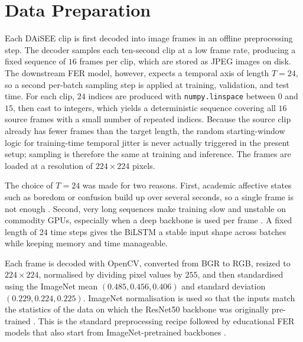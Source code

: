 \section{Data Preparation}\label{sec:method_preparation}

Each DAiSEE clip is first decoded into image frames in an offline preprocessing step. The decoder samples each ten-second clip at a low frame rate, producing a fixed sequence of $16$ frames per clip, which are stored as JPEG images on disk. The downstream FER model, however, expects a temporal axis of length $T = 24$, so a second per-batch sampling step is applied at training, validation, and test time. For each clip, $24$ indices are produced with \texttt{numpy.linspace} between $0$ and $15$, then cast to integers, which yields a deterministic sequence covering all $16$ source frames with a small number of repeated indices. Because the source clip already has fewer frames than the target length, the random starting-window logic for training-time temporal jitter is never actually triggered in the present setup; sampling is therefore the same at training and inference. The frames are loaded at a resolution of $224 \times 224$ pixels.

The choice of $T = 24$ was made for two reasons. First, academic affective states such as boredom or confusion build up over several seconds, so a single frame is not enough \cite{abedi_improving_2021,asaju_adaptive_2022}. Second, very long sequences make training slow and unstable on commodity GPUs, especially when a deep backbone is used per frame \cite{asaju_affects_2021}. A fixed length of $24$ time steps gives the BiLSTM a stable input shape across batches while keeping memory and time manageable.

Each frame is decoded with OpenCV, converted from BGR to RGB, resized to $224 \times 224$, normalised by dividing pixel values by $255$, and then standardised using the ImageNet mean $(0.485, 0.456, 0.406)$ and standard deviation $(0.229, 0.224, 0.225)$. ImageNet normalisation is used so that the inputs match the statistics of the data on which the ResNet50 backbone was originally pre-trained \cite{he_resnet_2016}. This is the standard preprocessing recipe followed by educational FER models that also start from ImageNet-pretrained backbones \cite{asaju_adaptive_2022,gupta_edfa_2023,aly_revolutionizing_2025}.

